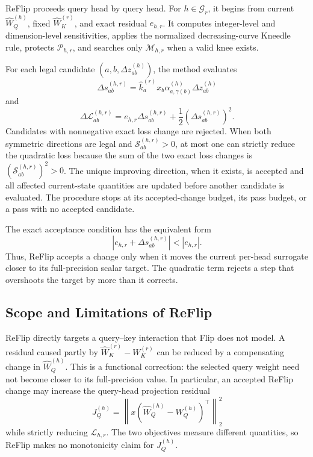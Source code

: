 ReFlip proceeds query head by query head. For $h\in\mathcal{G}_r$, it begins from current $\hat W_Q^{(h)}$, fixed $\hat W_K^{(r)}$, and exact residual $e_{h,r}$. It computes integer-level and dimension-level sensitivities, applies the normalized decreasing-curve Kneedle rule, protects $\mathcal{P}_{h,r}$, and searches only $\mathcal{M}_{h,r}$ when a valid knee exists.

For each legal candidate $(a,b,\Delta z^{(h)}_{ab})$, the method evaluates
\begin{equation}
\Delta s^{(h,r)}_{ab}
=
\hat k^{(r)}_a x_b
\alpha^{(h)}_{a,\gamma(b)}
\Delta z^{(h)}_{ab}
\end{equation}
and
\begin{equation}
\Delta\mathcal{L}^{(h,r)}_{ab}
=
e_{h,r}\Delta s^{(h,r)}_{ab}
+\frac{1}{2}\left(\Delta s^{(h,r)}_{ab}\right)^2.
\end{equation}
Candidates with nonnegative exact loss change are rejected. When both symmetric directions are legal and $\mathcal{S}^{(h,r)}_{ab}>0$, at most one can strictly reduce the quadratic loss because the sum of the two exact loss changes is $\left(\mathcal{S}^{(h,r)}_{ab}\right)^2>0$. The unique improving direction, when it exists, is accepted and all affected current-state quantities are updated before another candidate is evaluated. The procedure stops at its accepted-change budget, its pass budget, or a pass with no accepted candidate.

The exact acceptance condition has the equivalent form
\begin{equation}
\left|e_{h,r}+\Delta s^{(h,r)}_{ab}\right|
<
|e_{h,r}|.
\end{equation}
Thus, ReFlip accepts a change only when it moves the current per-head surrogate closer to its full-precision scalar target. The quadratic term rejects a step that overshoots the target by more than it corrects.

\subsection{Scope and Limitations of ReFlip}

ReFlip directly targets a query--key interaction that Flip does not model. A residual caused partly by $\hat W_K^{(r)}-W_K^{(r)}$ can be reduced by a compensating change in $\hat W_Q^{(h)}$. This is a functional correction: the selected query weight need not become closer to its full-precision value. In particular, an accepted ReFlip change may increase the query-head projection residual
\begin{equation}
J_Q^{(h)}
=
\left\|
x\left(\hat W_Q^{(h)}-W_Q^{(h)}\right)^\top
\right\|_2^2
\end{equation}
while strictly reducing $\mathcal{L}_{h,r}$. The two objectives measure different quantities, so ReFlip makes no monotonicity claim for $J_Q^{(h)}$.

